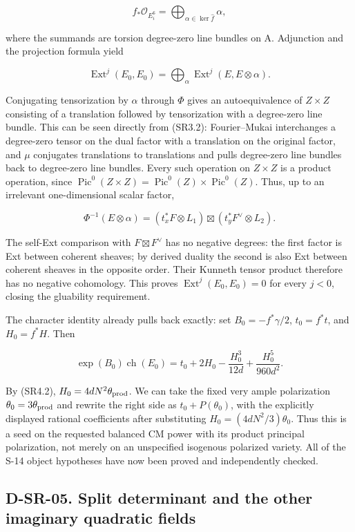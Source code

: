 \[
f_*\mathcal O_{E_i^6}=\bigoplus_{\alpha\in\ker\widehat f}\alpha,
\]

where the summands are torsion degree-zero line bundles on A. Adjunction and the projection formula yield

\[
\operatorname{Ext}^j(E_0,E_0)=\bigoplus_\alpha\operatorname{Ext}^j(E,E\otimes\alpha).
\]

Conjugating tensorization by \(\alpha\) through \(\Phi\) gives an autoequivalence of \(Z\times Z\) consisting of a translation followed by tensorization with a degree-zero line bundle. This can be seen directly from (SR3.2): Fourier--Mukai interchanges a degree-zero tensor on the dual factor with a translation on the original factor, and \(\mu\) conjugates translations to translations and pulls degree-zero line bundles back to degree-zero line bundles. Every such operation on \(Z\times Z\) is a product operation, since \(\operatorname{Pic}^0(Z\times Z)=\operatorname{Pic}^0(Z)\times\operatorname{Pic}^0(Z)\). Thus, up to an irrelevant one-dimensional scalar factor, \cite{SR-Mukai1981}

\[
\Phi^{-1}(E\otimes\alpha)=(t_x^*F\otimes L_1)\boxtimes(t_y^*F^\vee\otimes L_2).
\]

The self-Ext comparison with \(F\boxtimes F^\vee\) has no negative degrees: the first factor is Ext between coherent sheaves; by derived duality the second is also Ext between coherent sheaves in the opposite order. Their Kunneth tensor product therefore has no negative cohomology. This proves \(\operatorname{Ext}^j(E_0,E_0)=0\) for every \(j< 0\), closing the gluability requirement.

The character identity already pulls back exactly: set \(B_0=-f^*\gamma/2\), \(t_0=f^*t\), and \(H_0=f^*H\). Then

\[
\exp(B_0)\operatorname{ch}(E_0)=t_0+2H_0-\frac{H_0^3}{12d}+\frac{H_0^5}{960d^2}.
\]

By (SR4.2), \(H_0=4dN^2\theta_{\rm prod}\). We can take the fixed very ample polarization \(\theta_0=3\theta_{\rm prod}\) and rewrite the right side as \(t_0+P(\theta_0)\), with the explicitly displayed rational coefficients after substituting \(H_0=(4dN^2/3)\theta_0\). Thus this is a seed on the requested balanced CM power with its product principal polarization, not merely on an unspecified isogenous polarized variety. All of the S-14 object hypotheses have now been proved and independently checked.

\subsection{D-SR-05. Split determinant and the other imaginary quadratic fields}
\label{D-SR-05}

